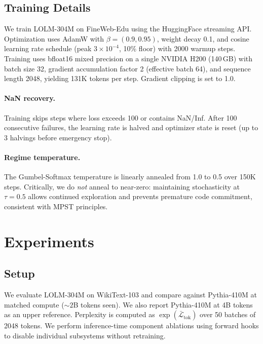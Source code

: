 \documentclass{article}
\begin{document}
\subsection{Training Details}
\label{sec:training_details}

We train LOLM-304M on FineWeb-Edu \citep{penedo2024fineweb} using the
HuggingFace streaming API. Optimization uses AdamW
\citep{loshchilov2017decoupled} with $\beta = (0.9, 0.95)$, weight decay 0.1,
and cosine learning rate schedule (peak $3 \times 10^{-4}$, 10\% floor) with
2000 warmup steps. Training uses bfloat16 mixed precision on a single NVIDIA
H200 (140\,GB) with batch size 32, gradient accumulation factor 2 (effective
batch 64), and sequence length 2048, yielding 131K tokens per step. Gradient
clipping is set to 1.0.

\paragraph{NaN recovery.} Training skips steps where loss exceeds 100 or
contains NaN/Inf. After 100 consecutive failures, the learning rate is halved
and optimizer state is reset (up to 3 halvings before emergency stop).

\paragraph{Regime temperature.} The Gumbel-Softmax temperature is linearly
annealed from 1.0 to 0.5 over 150K steps. Critically, we do \emph{not} anneal
to near-zero: maintaining stochasticity at $\tau{=}0.5$ allows continued
exploration and prevents premature code commitment, consistent with MPST
principles.

\section{Experiments}
\label{sec:experiments}

\subsection{Setup}
\label{sec:setup}

We evaluate LOLM-304M on WikiText-103 \citep{merity2016pointer} and compare
against Pythia-410M \citep{biderman2023pythia} at matched compute (${\sim}2$B
tokens seen). We also report Pythia-410M at 4B tokens as an upper reference.
Perplexity is computed as $\exp(\bar{\mathcal{L}}_\text{tok})$ over 50 batches
of 2048 tokens. We perform inference-time component ablations using forward
hooks to disable individual subsystems without retraining.
\end{document}
